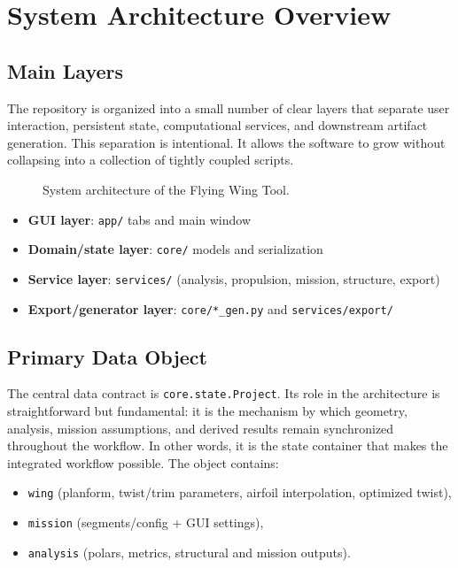 \section{System Architecture Overview}
\subsection{Main Layers}
The repository is organized into a small number of clear layers that separate user interaction, persistent state, computational services, and downstream artifact generation. This separation is intentional. It allows the software to grow without collapsing into a collection of tightly coupled scripts.

\begin{figure}[htbp]
\centering
{}
\caption{System architecture of the Flying Wing Tool.}
\label{fig:system-architecture-overview}
\end{figure}

\begin{itemize}
\item \textbf{GUI layer}: \texttt{app/} tabs and main window
\item \textbf{Domain/state layer}: \texttt{core/} models and serialization
\item \textbf{Service layer}: \texttt{services/} (analysis, propulsion, mission, structure, export)
\item \textbf{Export/generator layer}: \texttt{core/*\_gen.py} and \texttt{services/export/}
\end{itemize}

\subsection{Primary Data Object}
The central data contract is \texttt{core.state.Project}. Its role in the architecture is straightforward but fundamental: it is the mechanism by which geometry, analysis, mission assumptions, and derived results remain synchronized throughout the workflow. In other words, it is the state container that makes the integrated workflow possible. The object contains:
\begin{itemize}
\item \texttt{wing} (planform, twist/trim parameters, airfoil interpolation, optimized twist),
\item \texttt{mission} (segments/config + GUI settings),
\item \texttt{analysis} (polars, metrics, structural and mission outputs).
\end{itemize}


